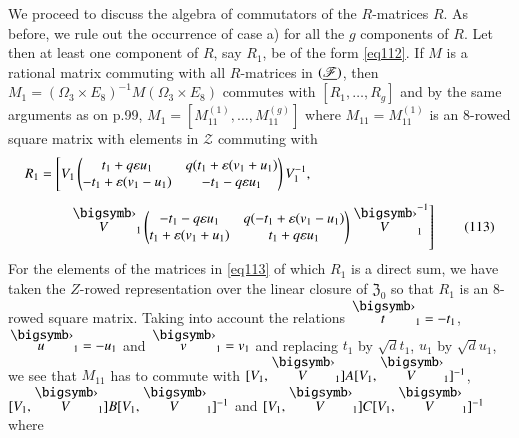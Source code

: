 We proceed to discuss the algebra of commutators of the $R$-matrices
$R$. As before, we rule out the occurrence of case a) for all the $g$
components of $R$. Let then at least one component of $R$, say
$R_{1}$, be of the form \eqref{eq112}. If $M$ is a rational matrix
commuting with all $R$-matrices in $(\underline{\mathscr{F}})$, then
$M_{1}=(\Omega_{3}\times E_{8})^{-1}M(\Omega_{3}\times E_{8})$
commutes with $[R_{1},\ldots,R_{g}]$ and by the same arguments as on
p.99, $M_{1}=[M^{(1)}_{11},\ldots,M^{(g)}_{11}]$ where
$M_{11}=M^{(1)}_{11}$ is an $8$-rowed square matrix with elements in
$\mathscr{Z}$ commuting with
\begin{align*}
R_{1}&=\left[
V_{1}
\begin{pmatrix}
t_{1}+q\varepsilon u_{1} & q(t_{1}+\varepsilon(v_{1}+u_{1})\\
-t_{1}+\varepsilon(v_{1}-u_{1}) & -t_{1}-q\varepsilon u_{1}
\end{pmatrix}V^{-1}_{1},\right.\\[5pt]
&\qquad\left.\overdot{V}_{1}
\begin{pmatrix}
-t_{1}-q\varepsilon u_{1} & q(-t_{1}+\varepsilon(v_{1}-u_{1})\\
t_{1}+\varepsilon(v_{1}+u_{1}) & t_{1}+q\varepsilon u_{1}
\end{pmatrix}
\overdot{V}^{-1}_{1}\right]\tag{113}\label{eq113} 
\end{align*}
For the elements of the matrices in \eqref{eq113} of which $R_{1}$ is a
direct sum, we have taken the $Z$-rowed representation over the linear
closure of $\mathfrak{Z}_{0}$ so that $R_{1}$ is an 8-rowed square
matrix. Taking into account the relations $\overdot{t}_{1}=-t_{1}$,
$\overdot{u}_{1}=-u_{1}$ and $\overdot{v}_{1}=v_{1}$ and replacing
$t_{1}$ by $\sqrt{d}t_{1}$, $u_{1}$ by $\sqrt{d}u_{1}$, we see that
$M_{11}$ has to commute with
$[V_{1},\overdot{V}_{1}]A[V_{1},\overdot{V}_{1}]^{-1}$,
$[V_{1},\overdot{V}_{1}]B[V_{1},\overdot{V}_{1}]^{-1}$ and
$[V_{1},\overdot{V}_{1}]C[V_{1},\overdot{V}_{1}]^{-1}$ where 
